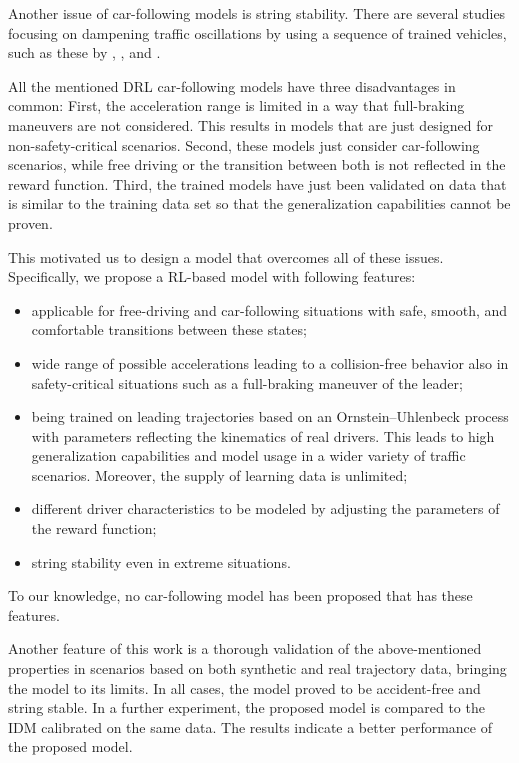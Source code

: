 \documentclass[review]{elsarticle}
\providecommand{\3}{{\ss}}
\begin{document}
	Another issue of car-following models is string stability. There are
	several studies focusing on dampening traffic oscillations by using a
	sequence of trained vehicles, such as these by \cite{qu2020jointly}, \cite{DissipatingStopAndGoWaves}, and \cite{DampenStopAndGoTraffic}.
	
	All the mentioned DRL car-following models have three disadvantages in
	common: First, the acceleration range is limited in a way that
	full-braking maneuvers are not considered. This results in models that are just designed for non-safety-critical scenarios. Second, these models just consider car-following scenarios, while free driving or the transition between both is not reflected in the reward function. Third, the trained models have just been validated on data that is similar to the training data set so that the generalization capabilities cannot be proven. 
	
	This motivated us to design a model that overcomes all of these issues.  Specifically,  we propose a RL-based model with following features:
	
	
	\begin{itemize}
		\item applicable for free-driving and car-following situations with safe, smooth, and  comfortable transitions between these states;
		\item wide range of possible
		accelerations leading to a collision-free behavior
		also in safety-critical situations such as a full-braking maneuver of the leader;
		\item being trained on leading trajectories
		based on an Ornstein–Uhlenbeck process \citep{OU}
		with parameters reflecting the kinematics of real
		drivers. This leads to high generalization capabilities and
		model usage in a wider variety of traffic
		scenarios. Moreover, the supply of learning data is
		unlimited;
		\item different driver characteristics to be modeled by adjusting the parameters of the reward function;
		\item string stability even in extreme situations.
	\end{itemize}
	To our knowledge, no car-following model has been proposed that has these features.
	
	Another feature of this work is a thorough validation of the above-mentioned properties in scenarios based on both synthetic and real trajectory data, bringing the model to its limits. 
	In all cases, the model proved to be accident-free and string stable.
	In a further experiment, the proposed model is compared to the IDM calibrated on the same data. The results indicate a better performance of the proposed model.
		
\end{document}
